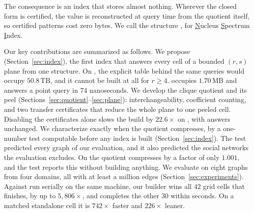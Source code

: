 The consequence is an index that stores almost nothing.
%
Wherever the closed form is certified, the value is reconstructed at query time from the quotient itself, so certified patterns cost zero bytes.
%
We call the structure \nsi, for \underline{N}ucleus \underline{S}pectrum \underline{I}ndex.

Our key contributions are summarized as follows.
%
We propose \nsi{} (Section~\ref{sec:index}), the first index that answers every cell of a bounded $(r,s)$ plane from one structure.
On \webit, the explicit table behind the same queries would occupy $50.8$\,TB, and it cannot be built at all for $r\ge4$.
%
\nsi{} occupies $1.70$\,MB and answers a point query in $74$ nanoseconds.
%
We develop the clique quotient and its peel (Sections~\ref{sec:quotient}--\ref{sec:plane}): interchangeability, coefficient counting, and two transfer certificates that reduce the whole plane to one peeled cell.
Disabling the certificates alone slows the build by $22.6\times$ on \nasasrb, with answers unchanged.
%
We characterize exactly when the quotient compresses, by a one-number test computable before any index is built (Section~\ref{sec:index}).
%
The test predicted every graph of our evaluation, and it also predicted the social networks the evaluation excludes.
%
On \pokec{} the quotient compresses by a factor of only $1.001$, and the test reports this without building anything.
%
We evaluate on eight graphs from four domains, all with at least a million edges (Section~\ref{sec:experiments}).
%
Against \cnd{} run serially on the same machine, our builder wins all $42$ grid cells that \cnd{} finishes, by up to $5{,}806\times$, and completes the other $30$ within seconds.
%
On a matched standalone cell it is $742\times$ faster and $226\times$ leaner.
